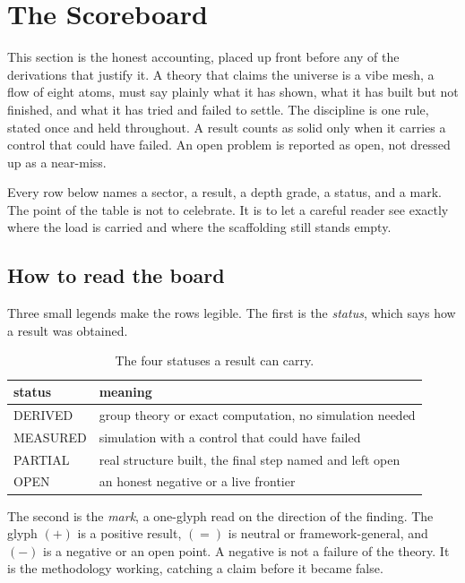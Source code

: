 \section{The Scoreboard}

This section is the honest accounting, placed up front before any of the derivations that justify it. A theory that claims the universe is a vibe mesh, a flow of eight atoms, must say plainly what it has shown, what it has built but not finished, and what it has tried and failed to settle. The discipline is one rule, stated once and held throughout. A result counts as solid only when it carries a control that could have failed. An open problem is reported as open, not dressed up as a near-miss.

Every row below names a sector, a result, a depth grade, a status, and a mark. The point of the table is not to celebrate. It is to let a careful reader see exactly where the load is carried and where the scaffolding still stands empty.

\subsection{How to read the board}

Three small legends make the rows legible. The first is the \emph{status}, which says how a result was obtained.

\begin{table}[ht]
\centering
\begin{tabular}{@{}ll@{}}
\toprule
status & meaning \\
\midrule
DERIVED & group theory or exact computation, no simulation needed \\
MEASURED & simulation with a control that could have failed \\
PARTIAL & real structure built, the final step named and left open \\
OPEN & an honest negative or a live frontier \\
\bottomrule
\end{tabular}
\caption{The four statuses a result can carry.}
\label{tab:status}
\end{table}

The second is the \emph{mark}, a one-glyph read on the direction of the finding. The glyph $(+)$ is a positive result, $(=)$ is neutral or framework-general, and $(-)$ is a negative or an open point. A negative is not a failure of the theory. It is the methodology working, catching a claim before it became false.


